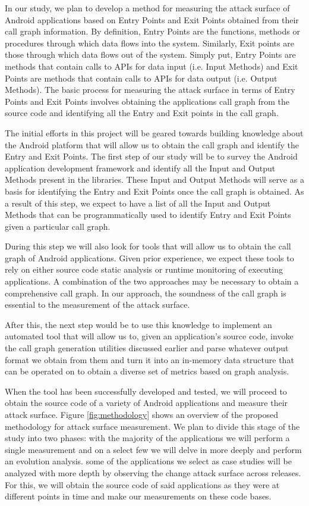 \documentclass[conference]{IEEEtran}
\begin{document}
In our study, we plan to develop a method for measuring the attack surface of Android applications based on Entry Points and Exit Points obtained from their call graph information. By definition, Entry Points are the functions, methods or procedures through which data flows into the system. Similarly, Exit points are those through which data flows out of the system. Simply put, Entry Points are methods that contain calls to APIs for data input (i.e. Input Methods) and Exit Points are methods that contain calls to APIs for data output (i.e. Output Methods). The basic process for measuring the attack surface in terms of Entry Points and Exit Points involves obtaining the applications call graph from the source code and identifying all the Entry and Exit points in the call graph.

The initial efforts in this project will be geared towards building knowledge about the Android platform that will allow us to obtain the call graph and identify the Entry and Exit Points. The first step of our study will be to survey the Android application development framework and identify all the Input and Output Methods present in the libraries. These Input and Output Methods will serve as a basis for identifying the Entry and Exit Points once the call graph is obtained. As a result of this step, we expect to have a list of all the Input and Output Methods that can be programmatically used to identify Entry and Exit Points given a particular call graph.

During this step we will also look for tools that will allow us to obtain the call graph of Android applications. Given prior experience, we expect these tools to rely on either source code static analysis or runtime monitoring of executing applications. A combination of the two approaches may be necessary to obtain a comprehensive call graph. In our approach, the soundness of the call graph is essential to the measurement of the attack surface.

After this, the next step would be to use this knowledge to implement an automated tool that will allow us to, given an application's source code, invoke the call graph generation utilities discussed earlier and parse whatever output format we obtain from them and turn it into an in-memory data structure that can be operated on to obtain a diverse set of metrics based on graph analysis.

When the tool has been successfully developed and tested, we will proceed to obtain the source code of a variety of Android applications and measure their attack surface. Figure \ref{fig:methodology} shows an overview of the proposed methodology for attack surface measurement. We plan to divide this stage of the study into two phases: with the majority of the applications we will perform a single measurement and on a select few we will delve in more deeply and perform an evolution analysis. some of the applications we select as case studies will be analyzed with more depth by observing the change attack surface across releases. For this, we will obtain the source code of said applications as they were at different points in time and make our measurements on these code bases.
\end{document}
